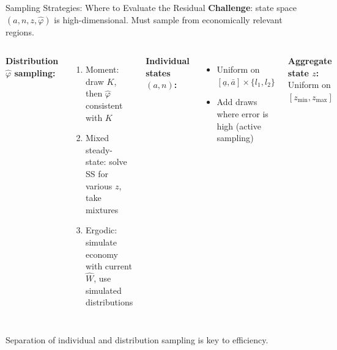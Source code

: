\documentclass[aspectratio=169,11pt]{beamer}
\newcommand{\emphc}[1]{\textcolor{harvardcrimson}{#1}}
\newcommand{\ubar}[1]{\underline{#1}}
\begin{document}
\begin{frame}{Sampling Strategies: Where to Evaluate the Residual}
\small
\textbf{Challenge}: state space $(a, n, z, \hat{\varphi})$ is high-dimensional.
Must sample from \emphc{economically relevant} regions.

\vspace{0.1em}
\begin{columns}[T]
\footnotesize
\textbf{Distribution $\hat{\varphi}$ sampling:}
\begin{enumerate}\itemsep0pt
    \item \emphc{Moment}: draw $K$, then $\hat{\varphi}$ consistent with $K$
    \item \emphc{Mixed steady-state}: solve SS for various $z$, take mixtures
    \item \emphc{Ergodic}: simulate economy with current $\hat{W}$, use simulated distributions
\end{enumerate}

\footnotesize
\textbf{Individual states $(a, n)$:}
\begin{itemize}\itemsep0pt
    \item Uniform on $[\ubar{a}, \bar{a}] \times \{l_1, l_2\}$
    \item Add draws where error is high (\emphc{active sampling})
\end{itemize}

\vspace{0.1em}
\textbf{Aggregate state $z$:} Uniform on $[z_{\min}, z_{\max}]$
\end{columns}

\vspace{0.2em}
\begin{center}
\colorbox{uzhgreylight}{\parbox{0.85\textwidth}{\centering\small
\emphc{Separation of individual and distribution sampling} is key to efficiency.}}
\end{center}
\end{frame}
\end{document}
